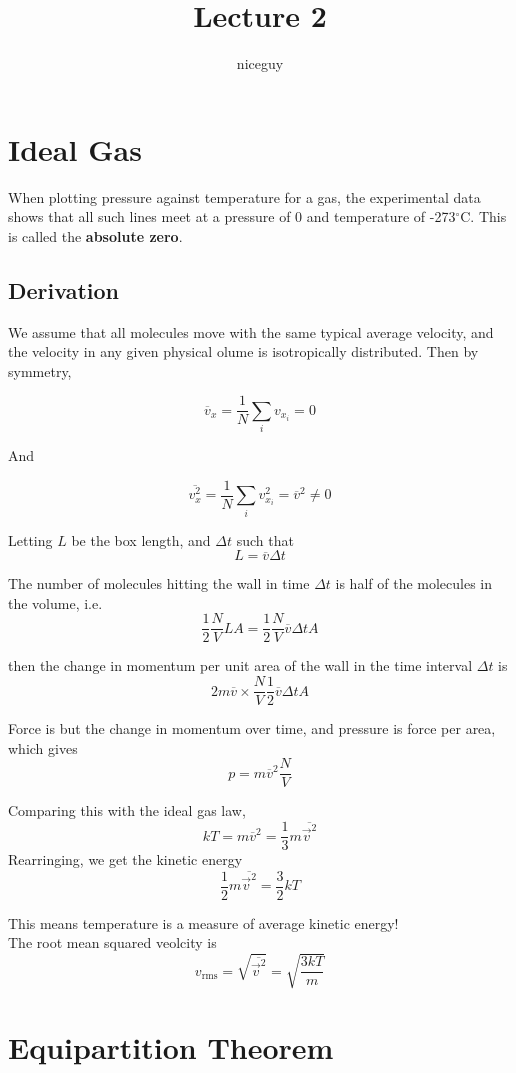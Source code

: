 \documentclass[12pt]{article}
\author{niceguy}
\title{Lecture 2}
\begin{document}
\maketitle

\section{Ideal Gas}

When plotting pressure against temperature for a gas, the experimental data shows that all such lines meet at a pressure of 0 and temperature of -273$^\circ$C. This is called the \textbf{absolute zero}.

\subsection{Derivation}

We assume that all molecules move with the same typical average velocity, and the velocity in any given physical olume is isotropically distributed. Then by symmetry,

$$\overline{v}_x = \frac{1}{N} \sum_i v_{x_i} = 0$$

And

$$\overline{v_x^2} = \frac{1}{N} \sum_i v^2_{x_i} = \overline{v}^2 \neq 0$$

Letting $L$ be the box length, and $\Delta t$ such that
$$L = \overline{v}\Delta t$$

The number of molecules hitting the wall in time $\Delta t$ is half of the molecules in the volume, i.e.
$$\frac{1}{2}\frac{N}{V}LA = \frac{1}{2} \frac{N}{V} \overline{v}\Delta tA$$

then the change in momentum per unit area of the wall in the time interval $\Delta t$ is
$$2m\overline{v} \times \frac{N}{V} \frac{1}{2} \overline{v}\Delta tA$$

Force is but the change in momentum over time, and pressure is force per area, which gives
$$p = m\overline{v}^2\frac{N}{V}$$

Comparing this with the ideal gas law,
$$kT = m\overline{v}^2 = \frac{1}{3} m\overline{\vec{v}^2}$$
Rearringing, we get the kinetic energy
$$\frac{1}{2}m\overline{\vec{v}^2} = \frac{3}{2}kT$$

This means temperature is a measure of average kinetic energy! \\
The root mean squared veolcity is
$$v_{\text{rms}} = \sqrt{\overline{\vec{v}^2}} = \sqrt{\frac{3kT}{m}}$$

\section{Equipartition Theorem}
\end{document}
